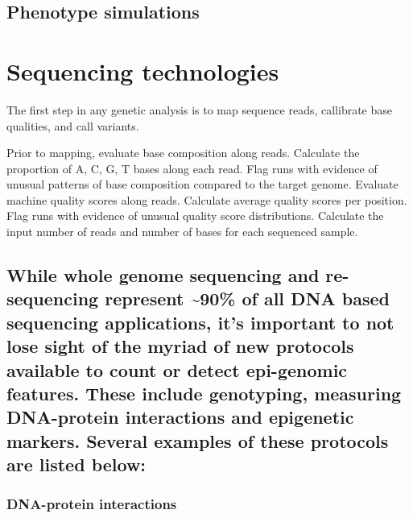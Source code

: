 \documentclass[
]{book}
\begin{document}
\hypertarget{phenotype-simulations}{%
\section{Phenotype simulations}\label{phenotype-simulations}}

\hypertarget{sequencing-technologies}{%
\chapter{Sequencing technologies}\label{sequencing-technologies}}

The first step in any genetic analysis is to map sequence reads, callibrate base qualities, and call variants.

Prior to mapping, evaluate base composition along reads. Calculate the proportion of A, C, G, T bases along each read. Flag runs with evidence of unusual patterns of base composition compared to the target genome.
Evaluate machine quality scores along reads. Calculate average quality scores per position. Flag runs with evidence of unusual quality score distributions.
Calculate the input number of reads and number of bases for each sequenced sample.

\hypertarget{while-whole-genome-sequencing-and-re-sequencing-represent-90-of-all-dna-based-sequencing-applications-its-important-to-not-lose-sight-of-the-myriad-of-new-protocols-available-to-count-or-detect-epi-genomic-features.-these-include-genotyping-measuring-dna-protein-interactions-and-epigenetic-markers.-several-examples-of-these-protocols-are-listed-below}{%
\section{While whole genome sequencing and re-sequencing represent \textasciitilde90\% of all DNA based sequencing applications, it's important to not lose sight of the myriad of new protocols available to count or detect epi-genomic features. These include genotyping, measuring DNA-protein interactions and epigenetic markers. Several examples of these protocols are listed below:}\label{while-whole-genome-sequencing-and-re-sequencing-represent-90-of-all-dna-based-sequencing-applications-its-important-to-not-lose-sight-of-the-myriad-of-new-protocols-available-to-count-or-detect-epi-genomic-features.-these-include-genotyping-measuring-dna-protein-interactions-and-epigenetic-markers.-several-examples-of-these-protocols-are-listed-below}}

\hypertarget{dna-protein-interactions}{%
\subsection{DNA-protein interactions}\label{dna-protein-interactions}}
\end{document}
